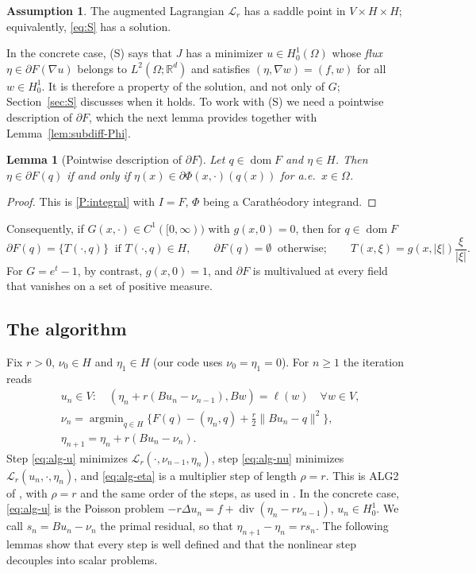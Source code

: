 \documentclass[11pt]{amsart}
\newtheorem{lemma}[theorem]{Lemma}
\theoremstyle{definition}
\newtheorem{assumption}{Assumption}
\theoremstyle{remark}
\numberwithin{equation}{section}
\newcommand{\R}{\mathbb{R}}
\newcommand{\Lag}{\mathcal{L}_r}
\newcommand{\abs}[1]{\lvert #1\rvert}
\newcommand{\norm}[1]{\lVert #1\rVert}
\DeclareMathOperator{\dom}{dom}
\DeclareMathOperator{\divg}{div}
\DeclareMathOperator*{\argmin}{argmin}
\begin{document}
\begin{assumption}\label{ass:S}
The augmented Lagrangian $\Lag$ has a saddle point in $V\times H\times H$; equivalently, \eqref{eq:S} has a solution.
\end{assumption}
In the concrete case, (S) says that $J$ has a minimizer $u\in H^1_0(\Omega)$ whose \emph{flux} $\eta\in\partial F(\nabla u)$ belongs to $L^2(\Omega;\R^d)$ and satisfies $(\eta,\nabla w)=(f,w)$ for all $w\in H^1_0$. It is therefore a property of the solution, and not only of $G$; Section~\ref{sec:S} discusses when it holds. To work with (S) we need a pointwise description of $\partial F$, which the next lemma provides together with Lemma~\ref{lem:subdiff-Phi}.

\begin{lemma}[Pointwise description of $\partial F$]\label{lem:pointwise}
Let $q\in\dom F$ and $\eta\in H$. Then $\eta\in\partial F(q)$ if and only if $\eta(x)\in\partial\Phi(x,\cdot)(q(x))$ for a.e.\ $x\in\Omega$.
\end{lemma}
\begin{proof}
This is \ref{P:integral} with $I=F$, $\Phi$ being a Carath\'eodory integrand.
\end{proof}

Consequently, if $G(x,\cdot)\in C^1([0,\infty))$ with $g(x,0)=0$, then for $q\in\dom F$
\begin{equation}\label{eq:dF-C1}
\partial F(q)=\{T(\cdot,q)\}\ \text{ if } T(\cdot,q)\in H,\qquad \partial F(q)=\emptyset\ \text{ otherwise};\qquad T(x,\xi)=g(x,\abs\xi)\frac{\xi}{\abs\xi}.
\end{equation}
For $G=e^t-1$, by contrast, $g(x,0)=1$, and $\partial F$ is multivalued at every field that vanishes on a set of positive measure.

\subsection{The algorithm}\label{ssec:algorithm}
Fix $r>0$, $\nu_0\in H$ and $\eta_1\in H$ (our code uses $\nu_0=\eta_1=0$). For $n\ge1$ the iteration reads
\begin{align}
&u_n\in V:\quad (\eta_n+r(Bu_n-\nu_{n-1}),Bw)=\ell(w)\quad\forall w\in V,\label{eq:alg-u}\\
&\nu_n=\argmin_{q\in H}\Big\{F(q)-(\eta_n,q)+\frac r2\norm{Bu_n-q}^2\Big\},\label{eq:alg-nu}\\
&\eta_{n+1}=\eta_n+r(Bu_n-\nu_n).\label{eq:alg-eta}
\end{align}
Step \eqref{eq:alg-u} minimizes $\Lag(\cdot,\nu_{n-1},\eta_n)$, step \eqref{eq:alg-nu} minimizes $\Lag(u_n,\cdot,\eta_n)$, and \eqref{eq:alg-eta} is a multiplier step of length $\rho=r$. This is ALG2 of \cite{FortinGlowinski1983ChIII}, \cite[Ch.~VI, (3.7)--(3.10)]{Glowinski1984ChVI} with $\rho=r$ and the same order of the steps, as used in \cite{AragonFBRubio2023}. In the concrete case, \eqref{eq:alg-u} is the Poisson problem $-r\Delta u_n=f+\divg(\eta_n-r\nu_{n-1})$, $u_n\in H^1_0$. We call $s_n=Bu_n-\nu_n$ the primal residual, so that $\eta_{n+1}-\eta_n=rs_n$. The following lemmas show that every step is well defined and that the nonlinear step decouples into scalar problems.
\end{document}
